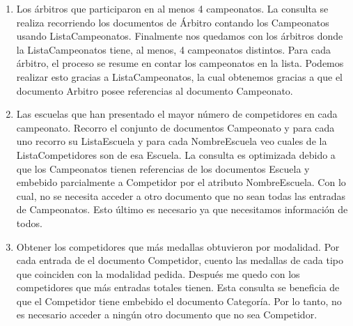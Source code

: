 \begin{enumerate}
\item Los árbitros que participaron en al menos 4 campeonatos. La consulta se realiza recorriendo los documentos
de Árbitro contando los Campeonatos usando ListaCampeonatos. Finalmente nos quedamos con los árbitros donde la ListaCampeonatos
tiene, al menos, 4 campeonatos distintos. Para cada árbitro, el proceso se resume en contar los campeonatos en la lista.
Podemos realizar esto gracias a ListaCampeonatos, la cual obtenemos gracias a que el documento Arbitro posee referencias
al documento Campeonato.

\item Las escuelas que han presentado el mayor número de competidores en cada campeonato. Recorro el conjunto de documentos
Campeonato y para cada uno recorro su ListaEscuela y para cada NombreEscuela veo cuales de la ListaCompetidores son de esa
Escuela. La consulta es optimizada debido a que los Campeonatos tienen referencias de los documentos Escuela y embebido parcialmente
a Competidor por el atributo NombreEscuela. Con lo cual, no se necesita acceder a otro documento que no sean todas las
entradas de Campeonatos. Esto último es necesario ya que necesitamos información de todos.

\item Obtener los competidores que más medallas obtuvieron por modalidad. Por cada entrada de el documento Competidor,
cuento las medallas de cada tipo que coinciden con la modalidad pedida. Después me quedo con los competidores que más entradas
totales tienen. Esta consulta se beneficia de que el Competidor tiene embebido el documento Categoría. Por lo tanto, no es
necesario acceder a ningún otro documento que no sea Competidor.

\end{enumerate}
